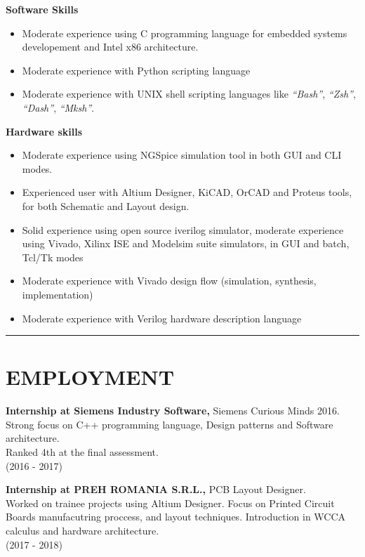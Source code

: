 \documentclass{resume}
\begin{document}
\begin{resume}
   {\bf Software Skills}	
        \begin{itemize}
        \item[] Moderate experience using C programming language for embedded systems developement and
        Intel x86 architecture.
        \item[] Moderate experience with Python scripting language
        \item[] Moderate experience with UNIX shell scripting languages like 
        {\it ``Bash''}, {\it ``Zsh''}, {\it ``Dash''}, {\it ``Mksh''}.
        \end{itemize}

   {\bf Hardware skills}	
        \begin{itemize}
        \item[] Moderate experience using NGSpice simulation tool in both GUI and CLI modes.
        \item[] Experienced user with Altium Designer, KiCAD, OrCAD and Proteus tools,
        for both Schematic and Layout design.
        \item[] Solid experience using open source iverilog simulator, moderate experience using Vivado,
        Xilinx ISE and Modelsim suite simulators, in GUI and batch, Tcl/Tk modes
        \item[] Moderate experience with Vivado design flow (simulation, synthesis, implementation)
        \item[] Moderate experience with Verilog hardware description language
        \end{itemize}

\noindent\rule{\textwidth}{0.4pt}
\section{EMPLOYMENT} 
\vspace{0.1in} 
    {\bf Internship at Siemens Industry Software,} Siemens Curious Minds 2016.\\
    Strong focus on C++ programming language, Design patterns and Software architecture.\\
    Ranked 4th at the final assessment.\\
    (2016 - 2017) 
 
    {\bf Internship at PREH ROMANIA S.R.L.,} PCB Layout Designer.\\
    Worked on trainee projects using Altium Designer. 
    Focus on Printed Circuit Boards manufacutring proccess, and layout techniques.
    Introduction in WCCA calculus and hardware architecture.\\
    (2017 - 2018)


\end{resume}
\end{document}
